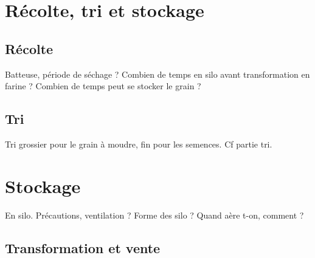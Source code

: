 \documentclass{article}
\begin{document}
\section{Récolte, tri et stockage}

\subsection{Récolte}

Batteuse, période de séchage ? Combien de temps en silo avant transformation en farine ? Combien de temps peut se stocker le grain ?

\subsection{Tri}

Tri grossier pour le grain à moudre, fin pour les semences. Cf partie tri.

\section{Stockage}

En silo. Précautions, ventilation ? Forme des silo ? Quand aère t-on, comment ? 

\subsection{Transformation et vente}
\end{document}
